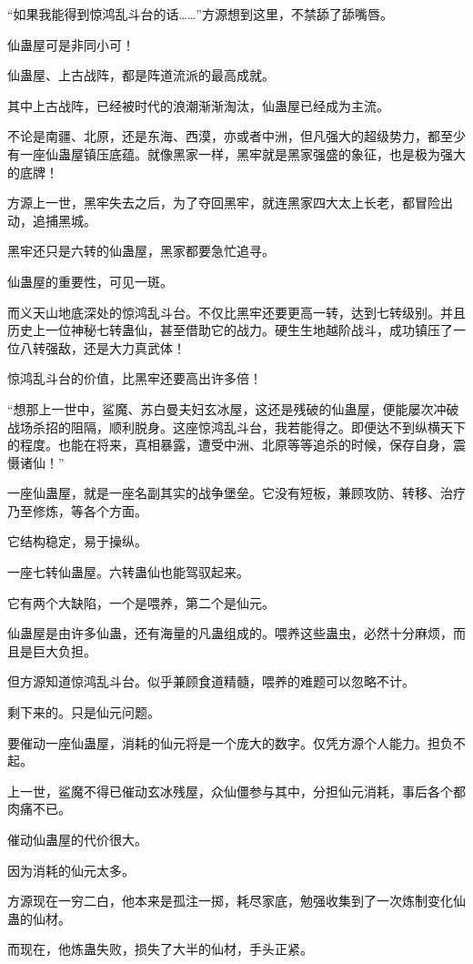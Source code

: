 \begin{this_body}
“如果我能得到惊鸿乱斗台的话……”方源想到这里，不禁舔了舔嘴唇。

仙蛊屋可是非同小可！

仙蛊屋、上古战阵，都是阵道流派的最高成就。

其中上古战阵，已经被时代的浪潮渐渐淘汰，仙蛊屋已经成为主流。

不论是南疆、北原，还是东海、西漠，亦或者中洲，但凡强大的超级势力，都至少有一座仙蛊屋镇压底蕴。就像黑家一样，黑牢就是黑家强盛的象征，也是极为强大的底牌！

方源上一世，黑牢失去之后，为了夺回黑牢，就连黑家四大太上长老，都冒险出动，追捕黑城。

黑牢还只是六转的仙蛊屋，黑家都要急忙追寻。

仙蛊屋的重要性，可见一斑。

而义天山地底深处的惊鸿乱斗台。不仅比黑牢还要更高一转，达到七转级别。并且历史上一位神秘七转蛊仙，甚至借助它的战力。硬生生地越阶战斗，成功镇压了一位八转强敌，还是大力真武体！

惊鸿乱斗台的价值，比黑牢还要高出许多倍！

“想那上一世中，鲨魔、苏白曼夫妇玄冰屋，这还是残破的仙蛊屋，便能屡次冲破战场杀招的阻隔，顺利脱身。这座惊鸿乱斗台，我若能得之。即便达不到纵横天下的程度。也能在将来，真相暴露，遭受中洲、北原等等追杀的时候，保存自身，震慑诸仙！”

一座仙蛊屋，就是一座名副其实的战争堡垒。它没有短板，兼顾攻防、转移、治疗乃至修炼，等各个方面。

它结构稳定，易于操纵。

一座七转仙蛊屋。六转蛊仙也能驾驭起来。

它有两个大缺陷，一个是喂养，第二个是仙元。

仙蛊屋是由许多仙蛊，还有海量的凡蛊组成的。喂养这些蛊虫，必然十分麻烦，而且是巨大负担。

但方源知道惊鸿乱斗台。似乎兼顾食道精髓，喂养的难题可以忽略不计。

剩下来的。只是仙元问题。

要催动一座仙蛊屋，消耗的仙元将是一个庞大的数字。仅凭方源个人能力。担负不起。

上一世，鲨魔不得已催动玄冰残屋，众仙僵参与其中，分担仙元消耗，事后各个都肉痛不已。

催动仙蛊屋的代价很大。

因为消耗的仙元太多。

方源现在一穷二白，他本来是孤注一掷，耗尽家底，勉强收集到了一次炼制变化仙蛊的仙材。

而现在，他炼蛊失败，损失了大半的仙材，手头正紧。


\end{this_body}
